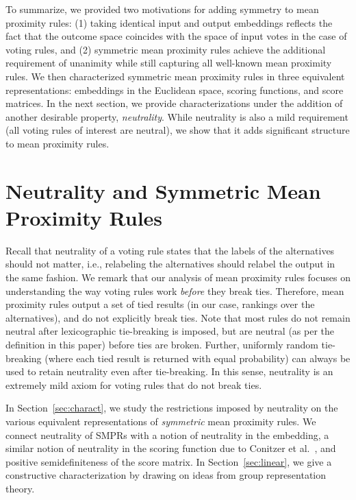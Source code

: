 \documentclass[prodmode]{acmsmall-ec14}
\begin{document}
To summarize, we provided two motivations for adding symmetry to mean proximity rules: (1) taking identical input and output embeddings reflects the fact that the outcome space coincides with the space of input votes in the case of voting rules, and (2) symmetric mean proximity rules achieve the additional requirement of unanimity while still capturing all well-known mean proximity rules. We then characterized symmetric mean proximity rules in three equivalent representations: embeddings in the Euclidean space, scoring functions, and score matrices. In the next section, we provide characterizations under the addition of another desirable property, \emph{neutrality}. While neutrality is also a mild requirement (all voting rules of interest are neutral), we show that it adds significant structure to mean proximity rules. 


\section{Neutrality and Symmetric Mean Proximity Rules}
\label{sec:neutrality}
Recall that neutrality of a voting rule states that the labels of the alternatives should not matter, i.e., relabeling the alternatives should relabel the output in the same fashion. We remark that our analysis of mean proximity rules focuses on understanding the way voting rules work \emph{before} they break ties. Therefore, mean proximity rules output a set of tied results (in our case, rankings over the alternatives), and do not explicitly break ties. Note that most rules do not remain neutral after lexicographic tie-breaking is imposed, but are neutral (as per the definition in this paper) before ties are broken. Further, uniformly random tie-breaking (where each tied result is returned with equal probability) can always be used to retain neutrality even after tie-breaking. In this sense, neutrality is an extremely mild axiom for voting rules that do not break ties. 

In Section~\ref{sec:charact}, we study the restrictions imposed by neutrality on the various equivalent representations of \emph{symmetric} mean proximity rules. We connect neutrality of SMPRs with a notion of neutrality in the embedding, a similar notion of neutrality in the scoring function due to Conitzer et al.~, and positive semidefiniteness of the score matrix. In Section~\ref{sec:linear}, we give a constructive characterization by drawing on ideas from group representation theory. 
\end{document}
